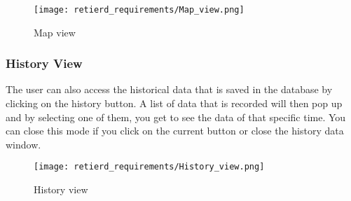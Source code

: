 \documentclass[../document]{subfiles}
\begin{document}
\begin{figure}[H]
	\centering
	\texttt{[image: retierd\_requirements/Map\_view.png]}
	\caption{Map view}
\end{figure}

\subsubsection{History View}
The user can also access the historical data that is saved in the database by clicking on the history button. A list of data that is recorded will then pop up and by selecting one of them, you get to see the data of that specific time. You can close this mode if you click on the current button or close the history data window.

\begin{figure}[H]
	\centering
	\texttt{[image: retierd\_requirements/History\_view.png]}
	\caption{History view}
\end{figure}
\end{document}
